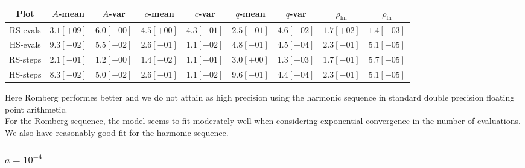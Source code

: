 \begin{table}[H]
    \centering
    \small
    \begin{tabular}{c||c|c|c|c|c|c|c|c}
Plot & \(A\)-mean & \(A\)-var & \(c\)-mean & \(c\)-var & \(q\)-mean & \(q\)-var & \(\rho_{\operatorname{lin}}\) & \(\rho_{\ln}\)\\\hline
\rowcolor{red}
RS-evals & \(3.1[+09]\) & \(6.0[+00]\) & \(4.5[+00]\) & \(4.3[-01]\) & \(2.5[-01]\) & \(4.6[-02]\) & \(1.7[+02]\) & \(1.4[-03]\) \\
\rowcolor{green}
HS-evals & \(9.3[-02]\) & \(5.5[-02]\) & \(2.6[-01]\) & \(1.1[-02]\) & \(4.8[-01]\) & \(4.5[-04]\) & \(2.3[-01]\) & \(5.1[-05]\) \\
\rowcolor{green}
RS-steps & \(2.1[-01]\) & \(1.2[+00]\) & \(1.4[-02]\) & \(1.1[-01]\) & \(3.0[+00]\) & \(1.3[-03]\) & \(1.7[-01]\) & \(5.7[-05]\) \\
\rowcolor{green}
HS-steps & \(8.3[-02]\) & \(5.0[-02]\) & \(2.6[-01]\) & \(1.1[-02]\) & \(9.6[-01]\) & \(4.4[-04]\) & \(2.3[-01]\) & \(5.1[-05]\) \\
    \end{tabular}
    \label{tab:my_label}
\end{table}

Here Romberg performes better and we do not attain as high precision using the harmonic sequence in standard double precision floating point arithmetic.\\

For the Romberg sequence, the model seems to fit moderately well when considering exponential convergence in the number of evaluations. We also have reasonably good fit for the harmonic sequence.\\

\subsubsection{\(a = 10^{-4}\)}

